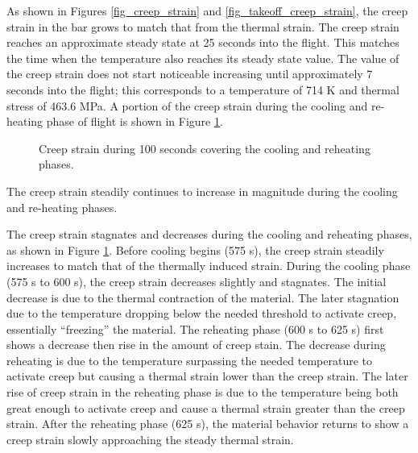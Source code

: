 \documentclass[conf]{new-aiaa}
\begin{document}
As shown in Figures \ref{fig_creep_strain}
and \ref{fig_takeoff_creep_strain}, the creep strain in the bar 
grows to match that from the thermal strain. 
The creep strain reaches an approximate steady state 
at 25 seconds into the flight. 
This matches the time when the temperature also reaches
its steady state value.
The value of the creep strain does not start noticeable increasing
until approximately 7 seconds into the flight;
this corresponds to a temperature of 714 K
and thermal stress of 463.6 MPa.
A portion of the creep strain during the cooling and re-heating
phase of flight is shown in Figure \ref{fig_touchdown_creep_strain}.

\begin{figure}[H]
  \centering
  \caption{ Creep strain during 100 seconds covering the cooling and reheating phases.}
  \label{fig_touchdown_creep_strain}
\end{figure}

The creep strain steadily continues to increase in magnitude 
during the cooling and re-heating phases. 

The creep strain stagnates and decreases during the cooling 
and reheating phases, as shown in Figure \ref{fig_touchdown_creep_strain}.
Before cooling begins (575 s), the creep strain steadily increases to 
match that of the thermally induced strain.
During the cooling phase (575 s to 600 s), the creep strain
decreases slightly and stagnates. 
The initial decrease is due to the thermal contraction of the material.
The later stagnation due to the temperature dropping below the needed 
threshold to activate creep, essentially ``freezing'' the material.
The reheating phase (600 s to 625 s) first shows a decrease then rise in 
the amount of creep stain.
The decrease during reheating is due to the temperature surpassing the
needed temperature to activate creep but causing a thermal strain
lower than the creep strain.
The later rise of creep strain in the reheating phase is due
to the temperature being both great enough to activate creep
and cause a thermal strain greater than the creep strain.
After the reheating phase (625 s), the material behavior
returns to show a creep strain slowly approaching the steady 
thermal strain.
\end{document}
